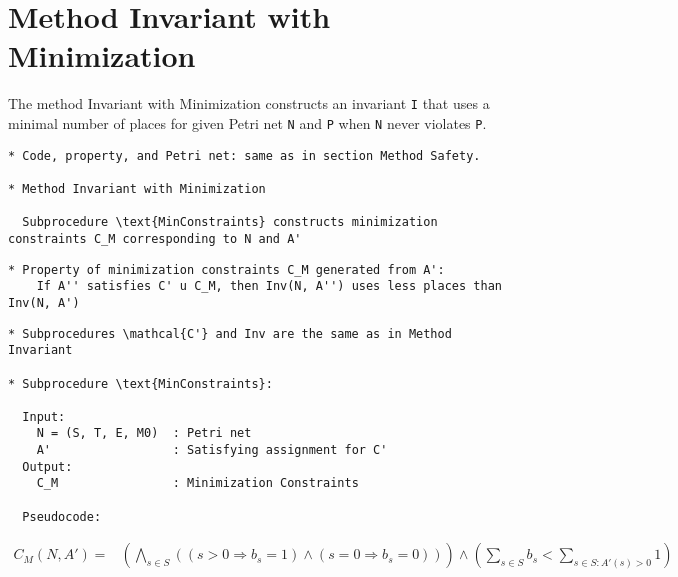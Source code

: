 \documentclass{llncs}
\begin{document}
\newpage

\section{Method Invariant with Minimization}

The method Invariant with Minimization constructs an invariant \verb=I=
that uses a minimal number of places for given Petri net \verb=N= and
\verb=P= when \verb=N= never violates \verb=P=. 

\begin{verbatim}
* Code, property, and Petri net: same as in section Method Safety.

* Method Invariant with Minimization

  Subprocedure \text{MinConstraints} constructs minimization constraints C_M corresponding to N and A'
\end{verbatim}





\begin{verbatim}
* Property of minimization constraints C_M generated from A': 
    If A'' satisfies C' u C_M, then Inv(N, A'') uses less places than Inv(N, A')
\end{verbatim}

\newpage

\begin{verbatim}
* Subprocedures \mathcal{C'} and Inv are the same as in Method Invariant

* Subprocedure \text{MinConstraints}:

  Input:
    N = (S, T, E, M0)  : Petri net
    A'                 : Satisfying assignment for C'
  Output:
    C_M                : Minimization Constraints

  Pseudocode:

\end{verbatim}

\begin{align*}
  C_M(N, A') =& \left( \bigwedge_{s \in S} \left(
      (s > 0 \Rightarrow b_s = 1) \land (s = 0 \Rightarrow b_s = 0)
    \right) \right) \land
    \left( \sum_{s \in S} b_s < \sum_{s \in S : A'(s) > 0} 1 \right)
\end{align*}

\newpage
\end{document}

